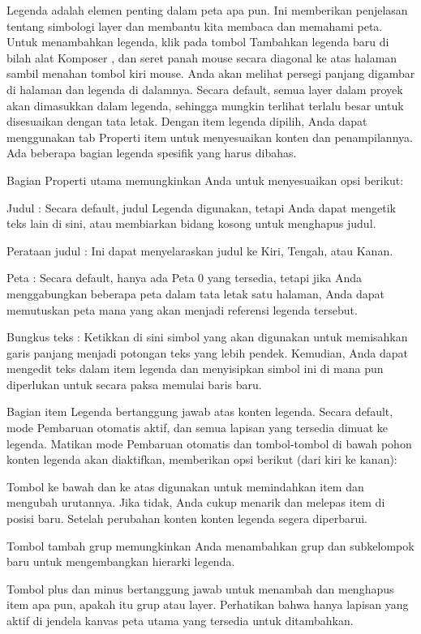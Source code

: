 \documentclass[]{book}
\begin{document}
Legenda adalah elemen penting dalam peta apa pun. Ini memberikan penjelasan tentang simbologi layer dan membantu kita membaca dan memahami peta. Untuk menambahkan legenda, klik pada tombol Tambahkan legenda baru di bilah alat Komposer , dan seret panah mouse secara diagonal ke atas halaman sambil menahan tombol kiri mouse. Anda akan melihat persegi panjang digambar di halaman dan legenda di dalamnya. Secara default, semua layer dalam proyek akan dimasukkan dalam legenda, sehingga mungkin terlihat terlalu besar untuk disesuaikan dengan tata letak. Dengan item legenda dipilih, Anda dapat menggunakan tab Properti item untuk menyesuaikan konten dan penampilannya. Ada beberapa bagian legenda spesifik yang harus dibahas.

Bagian Properti utama memungkinkan Anda untuk menyesuaikan opsi berikut:

Judul : Secara default, judul Legenda digunakan, tetapi Anda dapat mengetik teks lain di sini, atau membiarkan bidang kosong untuk menghapus judul.

Perataan judul : Ini dapat menyelaraskan judul ke Kiri, Tengah, atau Kanan.

Peta : Secara default, hanya ada Peta 0 yang tersedia, tetapi jika Anda menggabungkan beberapa peta dalam tata letak satu halaman, Anda dapat memutuskan peta mana yang akan menjadi referensi legenda tersebut.

Bungkus teks : Ketikkan di sini simbol yang akan digunakan untuk memisahkan garis panjang menjadi potongan teks yang lebih pendek. Kemudian, Anda dapat mengedit teks dalam item legenda dan menyisipkan simbol ini di mana pun diperlukan untuk secara paksa memulai baris baru.

Bagian item Legenda bertanggung jawab atas konten legenda. Secara default, mode Pembaruan otomatis aktif, dan semua lapisan yang tersedia dimuat ke legenda. Matikan mode Pembaruan otomatis dan tombol-tombol di bawah pohon konten legenda akan diaktifkan, memberikan opsi berikut (dari kiri ke kanan):

Tombol ke bawah dan ke atas digunakan untuk memindahkan item dan mengubah urutannya. Jika tidak, Anda cukup menarik dan melepas item di posisi baru. Setelah perubahan konten konten legenda segera diperbarui.

Tombol tambah grup memungkinkan Anda menambahkan grup dan subkelompok baru untuk mengembangkan hierarki legenda.

Tombol plus dan minus bertanggung jawab untuk menambah dan menghapus item apa pun, apakah itu grup atau layer. Perhatikan bahwa hanya lapisan yang aktif di jendela kanvas peta utama yang tersedia untuk ditambahkan.
\end{document}
